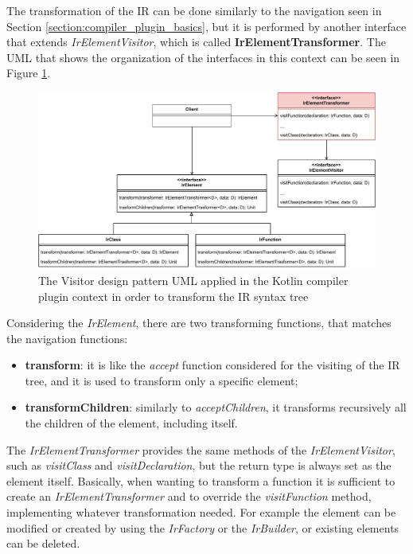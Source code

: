 The transformation of the IR can be done similarly to the navigation seen in Section \ref{section:compiler_plugin_basics}, but it is performed by another interface that extends \textit{IrElementVisitor}, which is called \textbf{IrElementTransformer}. The UML that shows the organization of the interfaces in this context can be seen in Figure \ref{fig:transformer_uml_kotlin_compiler}.\newline
\begin{figure}[!ht]
    \centering
    \includegraphics[scale=0.69]{document/chapters/2-metaprogramming/images/transformer_uml_kotlin_compiler.pdf}
    \caption{The Visitor design pattern UML applied in the Kotlin compiler plugin context in order to transform the IR syntax tree}
    \label{fig:transformer_uml_kotlin_compiler}
\end{figure}
Considering the \textit{IrElement}, there are two transforming functions, that matches the navigation functions:
\begin{itemize}
    \item \textbf{transform}: it is like the \textit{accept} function considered for the visiting of the IR tree, and it is used to transform only a specific element;
    \item \textbf{transformChildren}: similarly to \textit{acceptChildren}, it transforms recursively all the children of the element, including itself.
\end{itemize}
The \textit{IrElementTransformer} provides the same methods of the \textit{IrElementVisitor}, such as \textit{visitClass} and \textit{visitDeclaration}, but the return type is always set as the element itself. Basically, when wanting to transform a function it is sufficient to create an \textit{IrElementTransformer} and to override the \textit{visitFunction} method, implementing whatever transformation needed. For example the element can be modified  or created by using the \textit{IrFactory} or the \textit{IrBuilder}, or existing elements can be deleted.

